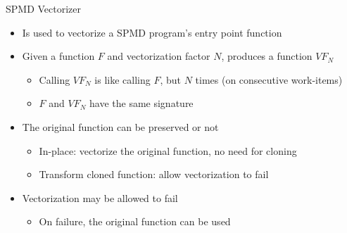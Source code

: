 

\begin{frame}{SPMD Vectorizer}

\begin{itemize}
    \item Is used to vectorize a SPMD program's entry point function
    \item Given a function $F$ and vectorization factor $N$, produces a function $VF_N$
    \begin{itemize}
        \item Calling $VF_N$ is like calling $F$, but $N$ times (on consecutive work-items)
        \item $F$ and $VF_N$ have the same signature
    \end{itemize}
    
    \item The original function can be preserved or not
    \begin{itemize}
        \item In-place: vectorize the original function, no need for cloning
        \item Transform cloned function: allow vectorization to fail
    \end{itemize}
    
    \item Vectorization may be allowed to fail
    \begin{itemize}
        \item On failure, the original function can be used 
    \end{itemize}
\end{itemize}

\end{frame}


